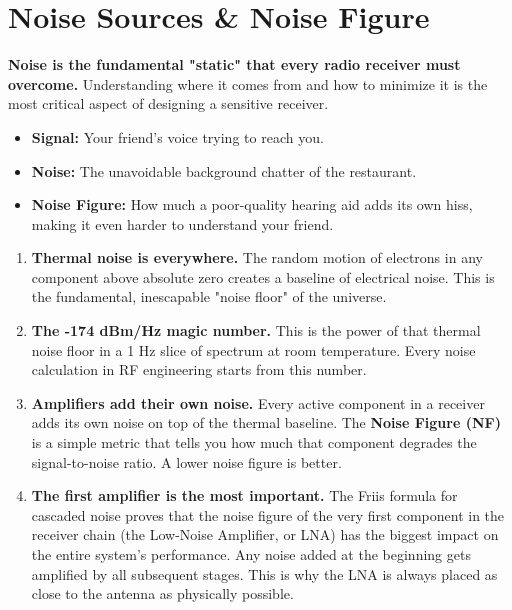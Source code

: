 
\chapter{Noise Sources \& Noise Figure}
\label{ch:noise}

\begin{nontechnical}
    \textbf{Noise is the fundamental "static" that every radio receiver must overcome.} Understanding where it comes from and how to minimize it is the most critical aspect of designing a sensitive receiver.

    \begin{itemize}
        \item \textbf{Signal:} Your friend's voice trying to reach you.
        \item \textbf{Noise:} The unavoidable background chatter of the restaurant.
        \item \textbf{Noise Figure:} How much a poor-quality hearing aid adds its own hiss, making it even harder to understand your friend.
    \end{itemize}

    \begin{enumerate}[label=\arabic*.]
        \item \textbf{Thermal noise is everywhere.} The random motion of electrons in any component above absolute zero creates a baseline of electrical noise. This is the fundamental, inescapable "noise floor" of the universe.
        \item \textbf{The -174 dBm/Hz magic number.} This is the power of that thermal noise floor in a 1 Hz slice of spectrum at room temperature. Every noise calculation in RF engineering starts from this number.
        \item \textbf{Amplifiers add their own noise.} Every active component in a receiver adds its own noise on top of the thermal baseline. The \textbf{Noise Figure (NF)} is a simple metric that tells you how much that component degrades the signal-to-noise ratio. A lower noise figure is better.
        \item \textbf{The first amplifier is the most important.} The Friis formula for cascaded noise proves that the noise figure of the very first component in the receiver chain (the Low-Noise Amplifier, or LNA) has the biggest impact on the entire system's performance. Any noise added at the beginning gets amplified by all subsequent stages. This is why the LNA is always placed as close to the antenna as physically possible.
    \end{enumerate}
\end{nontechnical}


